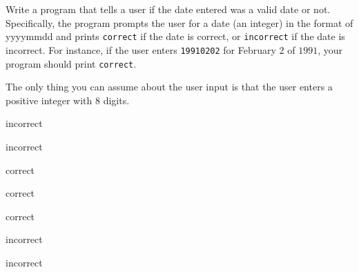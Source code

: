 Write a program that tells a user if the date entered was a valid date or not. 
Specifically, the program prompts the user for a date (an integer) in the 
format of yyyymmdd and prints \verb!correct! if the date is correct, or 
\verb!incorrect! if the date is incorrect. For instance, if the user enters 
\verb!19910202! for February $2$ of $1991$, your program should print
\verb!correct!.

The only thing you can assume about the user input is that the user enters a 
positive integer with $8$ digits.

\resett
\nextt
\begin{console}[commandchars=\\\{\}]
incorrect
\end{console}

\nextt
\begin{console}[commandchars=\\\{\}]
incorrect
\end{console}

\nextt
\begin{console}[commandchars=\\\{\}]
correct
\end{console}

\nextt
\begin{console}[commandchars=\\\{\}]
correct
\end{console}

\nextt
\begin{console}[commandchars=\\\{\}]
correct
\end{console}

\nextt
\begin{console}[commandchars=\\\{\}]
incorrect
\end{console}

\nextt
\begin{console}[commandchars=\\\{\}]
incorrect
\end{console}
